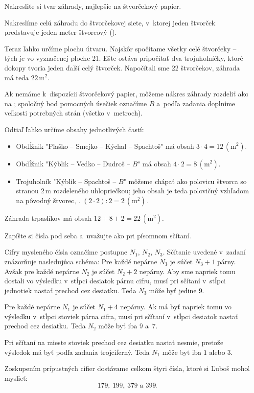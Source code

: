{%
\napad
Nakreslite si tvar záhrady, najlepšie na štvorčekový papier.

\riesenie
Nakreslíme celú záhradu do štvorčekovej siete, v~ktorej jeden štvorček
predstavuje jeden meter štvorcový (\obr).

Teraz ľahko určíme plochu útvaru.
Najskôr spočítame všetky celé štvorčeky -- tých je vo vyznačenej ploche 21.
Ešte ostáva pripočítať dva trojuholníčky, ktoré dokopy tvoria jeden ďalší
celý štvorček.
Napočítali sme 22 štvorčekov, záhrada má teda $22\,\text{m}^2$.

\ineriesenie
Ak nemáme k~dispozícii štvorčekový papier, môžeme nákres záhrady rozdeliť
ako na \obr; spoločný bod pomocných úsečiek označíme $B$ a~podľa zadania doplníme veľkosti potrebných strán (všetko v~metroch).

Odtiaľ ľahko určíme obsahy jednotlivých častí:
\begin{itemize}
  \item  Obdĺžnik "Plaško -- Smejko -- Kýchal -- Spachtoš" má obsah
    $3\cdot4=12\,(\text{m}^2)$.
  \item  Obdĺžnik "Kýblik -- Vedko -- Dudroš -- $B$" má obsah
    $4\cdot2=8\,(\text{m}^2)$.
  \item  Trojuholník "Kýblik -- Spachtoš -- $B$" môžeme chápať ako polovicu štvorca so stranou
    2\,m rozdeleného uhlopriečkou; jeho obsah je teda polovičný vzhľadom
    na pôvodný štvorec, \tj. $(2\cdot2):2=2\,(\text{m}^2)$.
\end{itemize}

Záhrada trpaslíkov má obsah $12+8+2=22\,(\text{m}^2)$.
}

{%
\napad
Zapíšte si čísla pod seba a~uvažujte ako pri písomnom sčítaní.

\riesenie
Cifry mysleného čísla označíme postupne $N_1$, $N_2$, $N_3$. Sčítanie uvedené v~zadaní znázorňuje nasledujúca schéma:
Pre každé nepárne $N_3$ je súčet $N_3+1$ párny. Avšak pre každé nepárne $N_2$ je súčet $N_2+2$ nepárny. Aby sme napriek tomu dostali vo výsledku v~stĺpci desiatok párnu cifru, musí pri sčítaní v~stĺpci jednotiek nastať prechod cez desiatku. Teda $N_3$ môže byť jedine $9$.

Pre každé nepárne $N_1$ je súčet $N_1+4$ nepárny. Ak má byť napriek tomu vo výsledku v~stĺpci stoviek párna cifra, musí pri sčítaní v~stĺpci desiatok nastať prechod cez desiatku. Teda $N_2$ môže byť iba $9$ a~$7$.

Pri sčítaní na mieste stoviek prechod cez desiatku nastať nesmie, pretože výsledok má byť podľa zadania trojciferný. Teda $N_1$ môže byt iba $1$ alebo $3$.

Zoskupením prípustných cifier dostávame celkom štyri čísla, ktoré si Ľuboš mohol myslieť:
$$
179,\ 199,\ 379\text{ a }399.
$$
}

